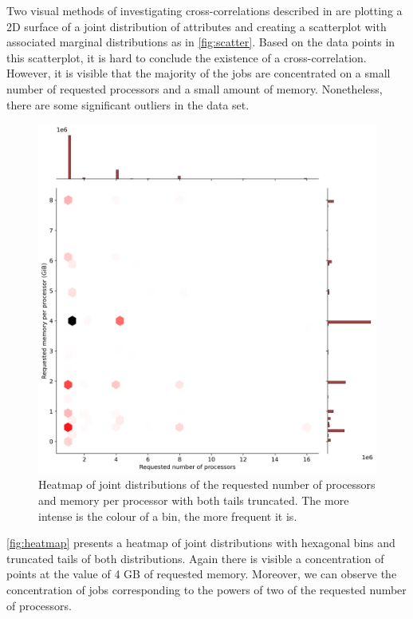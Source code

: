 \documentclass[thesis-en.tex]{subfiles}
\begin{document}
Two visual methods of investigating cross-correlations described in \cite{10.5555/2808941} are plotting a 2D surface of a joint distribution of attributes and creating a scatterplot with associated marginal distributions as in \autoref{fig:scatter}. Based on the data points in this scatterplot, it is hard to conclude the existence of a cross-correlation. However, it is visible that the majority of the jobs are concentrated on a small number of requested processors and a small amount of memory. Nonetheless, there are some significant outliers in the data set.

\begin{figure}[htb!]
    \includegraphics[width=\textwidth]{images/heatmap.png}
    \caption{Heatmap of joint distributions of the requested number of processors and memory per processor with both tails truncated. The more intense is the colour of a bin, the more frequent it is.}
    \label{fig:heatmap}
\end{figure}

\autoref{fig:heatmap} presents a heatmap of joint distributions with hexagonal bins and truncated tails of both distributions. Again there is visible a concentration of points at the value of 4 GB of requested memory. Moreover, we can observe the concentration of jobs corresponding to the powers of two of the requested number of processors.
\end{document}
